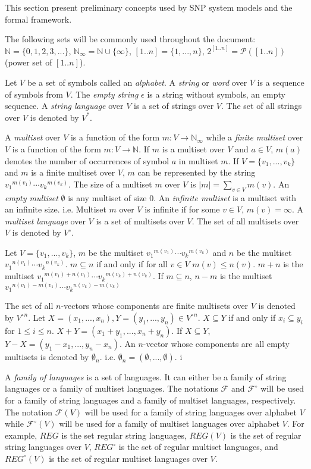 \documentclass[a4paper]{article}
\theoremstyle{definition}
\newcommand{\ra}{\rightarrow}
\begin{document}
This section present preliminary concepts used by SNP system models and the formal framework.

The following sets will be commonly used throughout the document: $\mathbb{N} = \{0,1,2,3,...\}$,
$\mathbb{N}_{\infty} = \mathbb{N} \cup \{\infty\}$, $[1..n] = \{1,...,n\}$, 
$2^{[1..n]}=\mathcal{P}([1..n])$ (power set of $[1..n]$).

Let $V$ be a set of symbols called an \emph{alphabet}. A \emph{string} or \emph{word} over $V$ is
a sequence of symbols from $V$. The \emph{empty string} $\epsilon$ is a string without symbols, an 
empty sequence. A \emph{string language} over $V$ is a set of strings over $V$. The set of all 
strings over $V$ is denoted by $V^*$.

A \emph{multiset} over $V$ is a function of the form $m: V \ra \mathbb{N}_{\infty}$ while a
\emph{finite multiset} over $V$ is a function of the form $m: V \ra \mathbb{N}$. If $m$ is a
multiset over $V$ and $a \in V$, $m(a)$ denotes the number of occurrences of symbol $a$ in multiset
$m$. If $V=\{v_1,...,v_k\}$ and $m$ is a finite multiset over $V$, $m$ can be represented by the
string ${v_1}^{m(v_1)}\cdots {v_k}^{m(v_k)}$. The size of a multiset $m$ over $V$ is
$|m| = \sum_{v\in V}m(v)$. An \emph{empty multiset} $\emptyset$ is any multiset of size $0$. An
\emph{infinite multiset} is a multiset with an infinite size. i.e. Multiset $m$ over $V$ is infinite
if for some $v\in V$, $m(v) = \infty$. A \emph{multiset language} over $V$ is a set of multisets 
over $V$. The set of all multisets over $V$ is denoted by $V^{\circ}$.

Let $V=\{v_1,...,v_k\}$, $m$ be the multiset ${v_1}^{m(v_1)}\cdots{v_k}^{m(v_k)}$ and $n$ be the  
multiset ${v_1}^{n(v_1)}\cdots{v_k}^{n(v_k)}$. $m \subseteq n$ if and only if for all $v \in V$ 
$m(v) \leq n(v)$. $m+n$ is the multiset ${v_1}^{m(v_1)+n(v_1)}\cdots {v_k}^{m(v_k)+n(v_k)}$. If 
$m \subseteq n$, $n-m$ is the multiset ${v_1}^{n(v_1)-m(v_1)}\cdots {v_k}^{n(v_k)-m(v_k)}$

The set of all $n$-vectors whose components are finite multisets over $V$ is denoted by
${V^{\circ}}^{n}$. Let $X=(x_1,...,x_n), Y=(y_1,...,y_n) \in {V^{\circ}}^n$. $X \subseteq Y$ if and
only if $x_i \subseteq y_i$ for $1 \leq i \leq n$. $X+Y = (x_1 + y_1,...,x_n + y_n)$. If 
$X \subseteq Y$, $Y-X = (y_1-x_1,...,y_n-x_n)$. An $n$-vector whose components are all empty 
multisets is denoted by $\emptyset_n$. i.e. $\emptyset_n = (\emptyset,...,\emptyset)$. i

A \emph{family of languages} is a set of languages. It can either be a family of string languages or 
a family of multiset languages. The notations $\mathscr{F}$ and $\mathscr{F}^{\circ}$ will be used
for a family of string languages and a family of multiset languages, respectively. The notation
$\mathscr{F}(V)$ will be used for a family of string languages over alphabet $V$ while 
$\mathscr{F}^{\circ}(V)$ will be used for a family of multiset languages over alphabet $V$. For
example, $REG$ is the set regular string languages, $REG(V)$ is the set of regular string 
languages over $V$, $REG^{\circ}$ is the set of regular multiset languages, and $REG^{\circ}(V)$ 
is the set of regular multiset languages over $V$.
\end{document}
